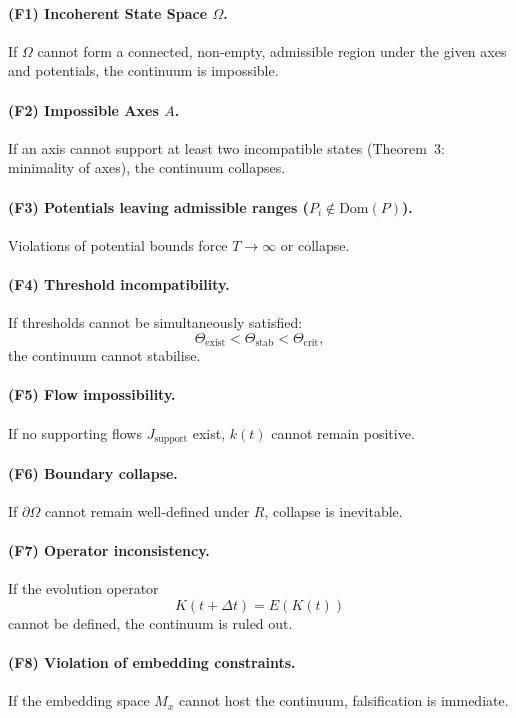 \paragraph{(F1) Incoherent State Space \texorpdfstring{$\Omega$}{\Omega}.}  
If $\Omega$ cannot form a connected, non-empty, admissible region under
the given axes and potentials, the continuum is impossible.

\paragraph{(F2) Impossible Axes \texorpdfstring{$A$}{A}.}  
If an axis cannot support at least two incompatible states 
(Theorem~3: minimality of axes), the continuum collapses.

\paragraph{(F3) Potentials leaving admissible ranges ($P_i \notin \mathrm{Dom}(P)$).}  
Violations of potential bounds force $T \to \infty$ or collapse.

\paragraph{(F4) Threshold incompatibility.}  
If thresholds cannot be simultaneously satisfied:
\[
\Theta_{\mathrm{exist}} < \Theta_{\mathrm{stab}} < \Theta_{\mathrm{crit}},
\]
the continuum cannot stabilise.

\paragraph{(F5) Flow impossibility.}  
If no supporting flows $J_{\mathrm{support}}$ exist, $k(t)$ cannot
remain positive.

\paragraph{(F6) Boundary collapse.}  
If $\partial\Omega$ cannot remain well-defined under $R$,
collapse is inevitable.

\paragraph{(F7) Operator inconsistency.}  
If the evolution operator 
\[
K(t+\Delta t) = E(K(t))
\]
cannot be defined, the continuum is ruled out.

\paragraph{(F8) Violation of embedding constraints.}  
If the embedding space $M_x$ cannot host the continuum, falsification
is immediate.



